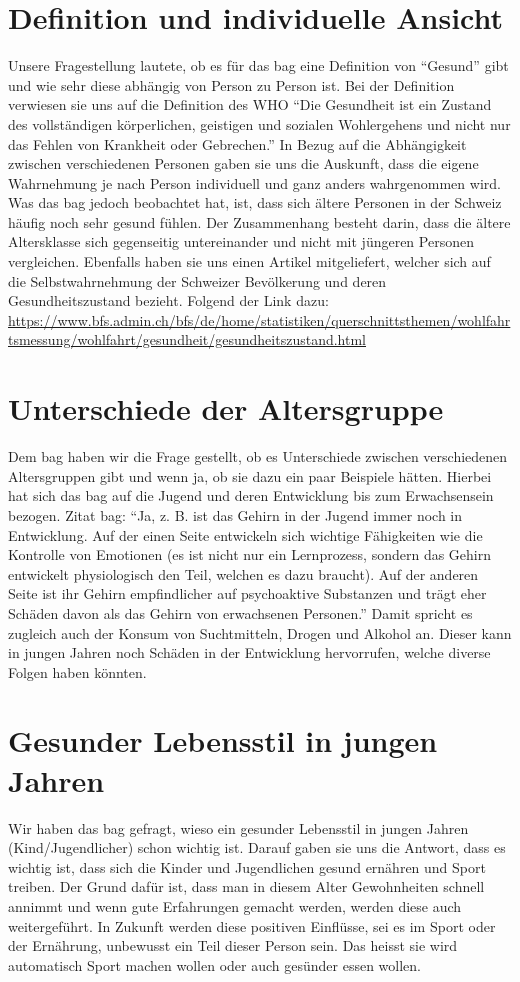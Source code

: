 \section{Definition und individuelle Ansicht}
Unsere Fragestellung lautete, ob es für das \acs{bag} eine Definition von “Gesund” gibt und wie sehr diese abhängig von Person zu Person ist. Bei der Definition verwiesen sie uns auf die Definition des WHO “Die Gesundheit ist ein Zustand des vollständigen körperlichen, geistigen und sozialen Wohlergehens und nicht nur das Fehlen von Krankheit oder Gebrechen.” \cite{gesundheit_definition}
In Bezug auf die Abhängigkeit zwischen verschiedenen Personen gaben sie uns die Auskunft, dass die eigene Wahrnehmung je nach Person individuell und ganz anders wahrgenommen wird. Was das \acs{bag} jedoch beobachtet hat, ist, dass sich ältere Personen in der Schweiz häufig noch sehr gesund fühlen. Der Zusammenhang besteht darin, dass die ältere Altersklasse sich gegenseitig untereinander und nicht mit jüngeren Personen vergleichen. Ebenfalls haben sie uns einen Artikel mitgeliefert, welcher sich auf die Selbstwahrnehmung der Schweizer Bevölkerung und deren Gesundheitszustand bezieht. Folgend der Link dazu:
\newline
\url{https://www.bfs.admin.ch/bfs/de/home/statistiken/querschnittsthemen/wohlfahrtsmessung/wohlfahrt/gesundheit/gesundheitszustand.html}
\section{Unterschiede der Altersgruppe}
Dem \acs{bag} haben wir die Frage gestellt, ob es Unterschiede zwischen verschiedenen Altersgruppen gibt und wenn ja, ob sie dazu ein paar Beispiele hätten. Hierbei hat sich das \acs{bag} auf die Jugend und deren Entwicklung bis zum Erwachsensein bezogen. Zitat \acs{bag}: “Ja, z. B. ist das Gehirn in der Jugend immer noch in Entwicklung. Auf der einen Seite entwickeln sich wichtige Fähigkeiten wie die Kontrolle von Emotionen (es ist nicht nur ein Lernprozess, sondern das Gehirn entwickelt physiologisch den Teil, welchen es dazu braucht). Auf der anderen Seite ist ihr Gehirn empfindlicher auf psychoaktive Substanzen und trägt eher Schäden davon als das Gehirn von erwachsenen Personen.” Damit spricht es zugleich auch der Konsum von Suchtmitteln, Drogen und Alkohol an. Dieser kann in jungen Jahren noch Schäden in der Entwicklung hervorrufen, welche diverse Folgen haben könnten.
\section{Gesunder Lebensstil in jungen Jahren}
Wir haben das \acs{bag} gefragt, wieso ein gesunder Lebensstil in jungen Jahren (Kind/Jugendlicher) schon wichtig ist. Darauf gaben sie uns die Antwort, dass es wichtig ist, dass sich die Kinder und Jugendlichen gesund ernähren und Sport treiben. Der Grund dafür ist, dass man in diesem Alter Gewohnheiten schnell annimmt und wenn gute Erfahrungen gemacht werden, werden diese auch weitergeführt. In Zukunft werden diese positiven Einflüsse, sei es im Sport oder der Ernährung, unbewusst ein Teil dieser Person sein. Das heisst sie wird automatisch Sport machen wollen oder auch gesünder essen wollen.
\pagebreak
